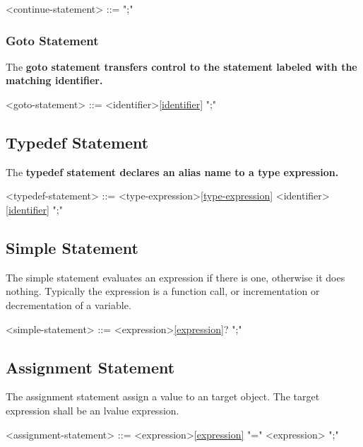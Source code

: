 \documentclass[a4paper,oneside,11pt]{article}
\begin{document}
\begin{grammar}
\label{continue-statement}<continue-statement> ::=  ";"
\end{grammar}

\subsubsection{Goto Statement}

The \bf{goto} statement transfers control to the statement labeled with the matching identifier.

\begin{grammar}
\label{goto-statement}<goto-statement> ::=  <identifier>\ref{identifier} ";"
\end{grammar}

\subsection{Typedef Statement}

The \bf{typedef} statement declares an alias name to a type expression.

\begin{grammar}
\label{typedef-statement}<typedef-statement> ::=  <type-expression>\ref{type-expression} <identifier>\ref{identifier} ";"
\end{grammar}

\subsection{Simple Statement}

The simple statement evaluates an expression if there is one, otherwise it does nothing.
Typically the expression is a function call, or incrementation or decrementation of a variable.

\begin{grammar}
\label{simple-statement}<simple-statement> ::= <expression>\ref{expression}? ";"
\end{grammar}

\subsection{Assignment Statement}

The assignment statement assign a value to an target object. The target expression shall be an lvalue expression.

\begin{grammar}
\label{assignment-statement}<assignment-statement> ::= <expression>\ref{expression} "=" <expression> ";"
\end{grammar}
\end{document}
